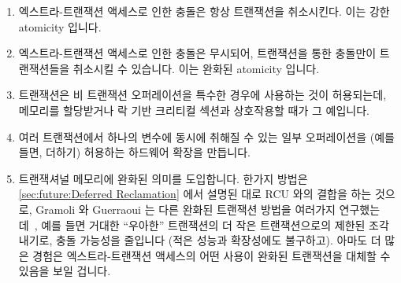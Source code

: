 \begin{enumerate}
\item	엑스트라-트랜잭션 액세스로 인한 충돌은 항상 트랜잭션을 취소시킨다.
	이는 강한 atomicity 입니다.
\item	엑스트라-트랜잭션 액세스로 인한 충돌은 무시되어, 트랜잭션을 통한
	충돌만이 트랜잭션들을 취소시킬 수 있습니다.
	이는 완화된 atomicity 입니다.
\item	트랜잭션은 비 트랜잭션 오퍼레이션을 특수한 경우에 사용하는 것이
	허용되는데, 메모리를 할당받거나 락 기반 크리티컬 섹션과 상호작용할
	때가 그 예입니다.
\item	여러 트랜잭션에서 하나의 변수에 동시에 취해질 수 있는 일부 오퍼레이션을
	(예를 들면, 더하기) 허용하는 하드웨어 확장을 만듭니다.
\item	트랜잭셔널 메모리에 완화된 의미를 도입합니다.
	한가지 방법은
	\cref{sec:future:Deferred Reclamation} 에서 설명된 대로 RCU 와의 결합을
	하는 것으로, Gramoli 와 Guerraoui 는 다른 완화된 트랜잭션 방법을
	여러가지 연구했는데~\cite{Gramoli:2014:DTP:2541883.2541900}, 예를 들면
	거대한 ``우아한'' 트랜잭션의 더 작은 트랜잭션으로의 제한된 조각내기로,
	충돌 가능성을 줄입니다 (적은 성능과 확장성에도 불구하고).
	아마도 더 많은 경험은 엑스트라-트랜잭션 액세스의 어떤 사용이 완화된
	트랜잭션을 대체할 수 있음을 보일 겁니다.

\end{enumerate}

